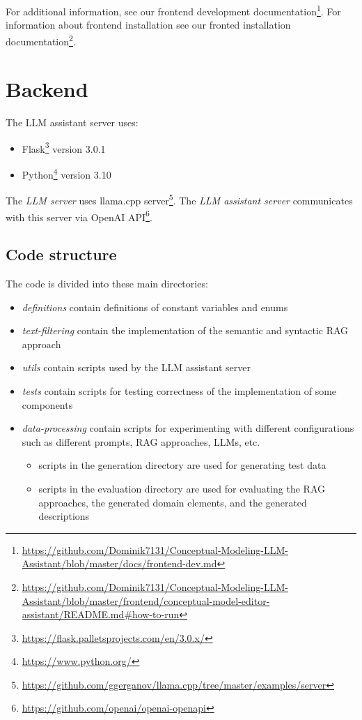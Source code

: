 \noindent{}For additional information, see our frontend development documentation\footnote{\url{https://github.com/Dominik7131/Conceptual-Modeling-LLM-Assistant/blob/master/docs/frontend-dev.md}}. For information about frontend installation see our fronted installation documentation\footnote{\url{https://github.com/Dominik7131/Conceptual-Modeling-LLM-Assistant/blob/master/frontend/conceptual-model-editor-assistant/README.md\#how-to-run}}.


\section{Backend}

\noindent{}The LLM assistant server uses:
\begin{itemize}
\item Flask\footnote{\url{https://flask.palletsprojects.com/en/3.0.x/}} version 3.0.1
\item Python\footnote{\url{https://www.python.org/}} version 3.10
\end{itemize}

\noindent{}The \emph{LLM server} uses llama.cpp server\footnote{\url{https://github.com/ggerganov/llama.cpp/tree/master/examples/server}}. The \emph{LLM assistant server} communicates with this server via OpenAI API\footnote{\url{https://github.com/openai/openai-openapi}}.


\subsection{Code structure}

\noindent{}The code is divided into these main directories:
\begin{itemize}
\item \textit{definitions} contain definitions of constant variables and enums
\item \textit{text-filtering} contain the implementation of the semantic and syntactic RAG approach
\item \textit{utils} contain scripts used by the LLM assistant server
\item \textit{tests} contain scripts for testing correctness of the implementation of some components
\item \textit{data-processing} contain scripts for experimenting with different configurations such as different prompts, RAG approaches, LLMs, etc.
\begin{itemize}
\item scripts in the generation directory are used for generating test data
\item scripts in the evaluation directory are used for evaluating the RAG approaches, the generated domain elements, and the generated descriptions
\end{itemize}
\end{itemize}

